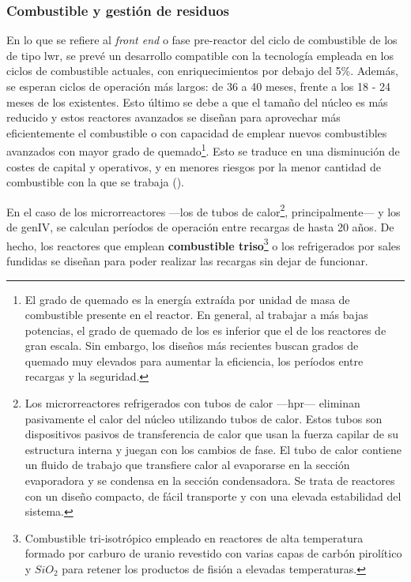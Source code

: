 \newpage
\subsubsection{Combustible y gestión de residuos} \label{combustible}

En lo que se refiere al \emph{front end} o fase pre-reactor del ciclo de combustible de los  de tipo \acrshort{lwr}, se prevé un desarrollo compatible con la tecnología empleada en los ciclos de combustible actuales, con enriquecimientos  por debajo del 5\%. Además, se esperan ciclos de operación más largos: de 36 a 40 meses, frente a los 18 - 24 meses de los  existentes. Esto último se debe a que el tamaño del núcleo es más reducido y estos reactores avanzados se diseñan para aprovechar más eficientemente el combustible o con capacidad de emplear nuevos combustibles avanzados con mayor \gls{grado de quemado}\footnote{El grado de quemado es la energía extraída por unidad de masa de combustible presente en el reactor. En general, al trabajar a más bajas potencias, el grado de quemado de los  es inferior que el de los reactores de gran escala. Sin embargo, los diseños más recientes buscan grados de quemado muy elevados para aumentar la eficiencia, los períodos entre recargas y la seguridad.}. Esto se traduce en una disminución de costes de capital y operativos, y en menores riesgos por la menor cantidad de combustible con la que se trabaja (\cite{overview_smrs}).

En el caso de los microrreactores ---los de \gls{tubos de calor}\footnote{Los microrreactores refrigerados con tubos de calor ---\acrfull{hpr}--- eliminan pasivamente el calor del núcleo  utilizando tubos de calor. Estos tubos son dispositivos pasivos de transferencia de calor que usan la fuerza capilar de su estructura interna y juegan con los cambios de fase. El tubo de calor contiene un fluido de trabajo que transfiere calor al evaporarse en la sección evaporadora y se condensa en la sección condensadora. Se trata de reactores con un diseño compacto, de fácil transporte y con una elevada estabilidad del sistema.}, principalmente--- y los  de \acrshort{genIV}, se calculan períodos de operación entre recargas de hasta 20 años. De hecho, los reactores que emplean \textbf{\gls{combustible} \acrshort{triso}}\footnote{Combustible tri-isotrópico empleado en reactores de alta temperatura formado por carburo de uranio revestido con varias capas de carbón pirolítico y $SiO_2$ para retener los productos de fisión a elevadas temperaturas.} o los refrigerados por sales fundidas se diseñan para poder realizar las recargas sin dejar de funcionar.


